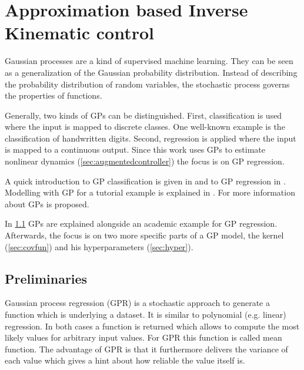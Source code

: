\chapter{Approximation based Inverse Kinematic control}
\label{cha:inverseKinematics}

Gaussian processes are a kind of supervised machine learning.
They can be seen as a generalization of the Gaussian probability distribution.
Instead of describing the probability distribution of random variables, the stochastic process governs the properties of functions.

Generally, two kinds of GPs can be distinguished.
First, classification is used where the input is mapped to discrete classes.
One well-known example is the classification of handwritten digits.
Second, regression is applied where the input is mapped to a continuous output.
Since this work uses GPs to estimate nonlinear dynamics (\cref{sec:augmentedcontroller}) the focus is on GP regression.

A quick introduction to GP classification is given in \cite{Ebden.2008b} and to GP regression in \cite{Ebden.2008}.
Modelling with GP for a tutorial example is explained in \cite{Gray.2003}.
For more information about GPs \cite{Rasmussen.2006} is proposed.

In \cref{sec:gpex} GPs are explained alongside an academic example for GP regression.
Afterwards, the focus is on two more specific parts of a GP model, the kernel (\cref{sec:covfun}) and his hyperparameters (\cref{sec:hyper}).


\section{Preliminaries}
\label{sec:gpex}
Gaussian process regression (GPR) is a stochastic approach to generate a function which is underlying a dataset.
It is similar to polynomial (e.g. linear) regression.
In both cases a function is returned which allows to compute the most likely values for arbitrary input values.
For GPR this function is called mean function.
The advantage of GPR is that it furthermore delivers the variance of each value which gives a hint about how reliable the value itself is.


